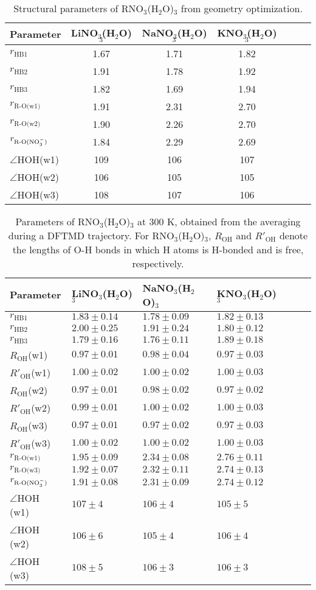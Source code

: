 \begin{table}[!htbp]
\centering
\caption{\label{tab:table_geo_opt}%
  Structural parameters of RNO$_3$(H$_2$O)$_3$ from geometry optimization.} 
\begin{tabular}{l*{4}ccc}
Parameter  & LiNO$_3$(H$_2$O)$_3$& NaNO$_3$(H$_2$O)$_3$ & KNO$_3$(H$_2$O)$_3$\\
\hline
$r_\text{HB1}$& 1.67 & 1.71 & 1.82 \\
$r_\text{HB2}$& 1.91 & 1.78 & 1.92\\
$r_\text{HB3}$& 1.82 & 1.69 & 1.94\\
$r_\text{R-O(w1)}$ & 1.91 & 2.31 & 2.70\\
$r_\text{R-O(w2)}$ & 1.90 & 2.26 & 2.70\\
$r_\text{R-O(NO$_3^-$)}$ & 1.84 & 2.29 & 2.69 \\
$\angle$HOH(w1)& 109 & 106 &107 \\
$\angle$HOH(w2)& 106 & 105&105 \\
$\angle$HOH(w3)& 108 & 107 &106
\end{tabular}
\end{table}
%
\begin{table}[H] %
\centering
\caption{\label{tab:table_rnitrate_3w}%
Parameters of RNO$_3$(H$_2$O)$_3$ at 300 K, obtained from the averaging during a DFTMD trajectory. 
  For RNO$_3$(H$_2$O)$_3$, $R_\text{OH}$ and $R'_\text{OH}$ 
  denote the lengths of O-H bonds in which H atoms is H-bonded and is free, respectively.
  }
\begin{tabular}{l*{4}lll}
Parameter & LiNO$_3$(H$_2$O)$_3$& NaNO$_3$(H$_2$O)$_3$ & KNO$_3$(H$_2$O)$_3$\\
\hline
$r_\text{HB1}$ & $1.83\pm0.14$ & $1.78\pm0.09$ & $1.82\pm0.13$\\
$r_\text{HB2}$ & $2.00\pm0.25$ & $1.91\pm0.24$ & $1.80\pm0.12$\\
$r_\text{HB3}$ &$1.79\pm0.16$ & $1.76\pm0.11$ & $1.89\pm0.18$\\
$R_\text{OH}$(w1) &$0.97\pm0.01$ &$0.98\pm0.04$ &$0.97\pm0.03$ \\
$R'_\text{OH}$(w1) &$1.00\pm0.02$ &$1.00\pm0.02$ & $1.00\pm0.03$ \\
$R_\text{OH} $(w2) &$0.97\pm0.01$ &$0.98\pm0.02$ &$0.97\pm0.02$ \\ 
$R'_\text{OH}$(w2) &$0.99\pm0.01$ &$1.00\pm0.02$ & $1.00\pm0.03$ \\
$R_\text{OH}$(w3) &$0.97\pm0.01$ & $0.97\pm0.02$&$0.97\pm0.03$ \\
$R'_\text{OH}$(w3) &$1.00\pm0.02$ &$1.00\pm0.02$ & $1.00\pm0.03$ \\
$r_\text{R-O(w1)}$ & $1.95\pm0.09$ & $2.34\pm0.08$ & $2.76\pm0.11$\\
$r_\text{R-O(w3)}$ & $1.92\pm0.07$ & $2.32\pm0.11$ & $2.74\pm0.13$\\
$r_\text{R-O(NO$_3^-$)}$ & $1.91\pm0.08$ & $2.31\pm0.09$ & $2.74\pm0.12$ \\
$\angle$HOH (w1) &$107\pm4$ & $106\pm4$ &$105\pm5$ \\
$\angle$HOH (w2) &$106\pm6$ & $105\pm4$ &$106\pm4$ \\
$\angle$HOH (w3) &$108\pm5$ & $106\pm3$ &$106\pm3$ 
\end{tabular}
\end{table}
